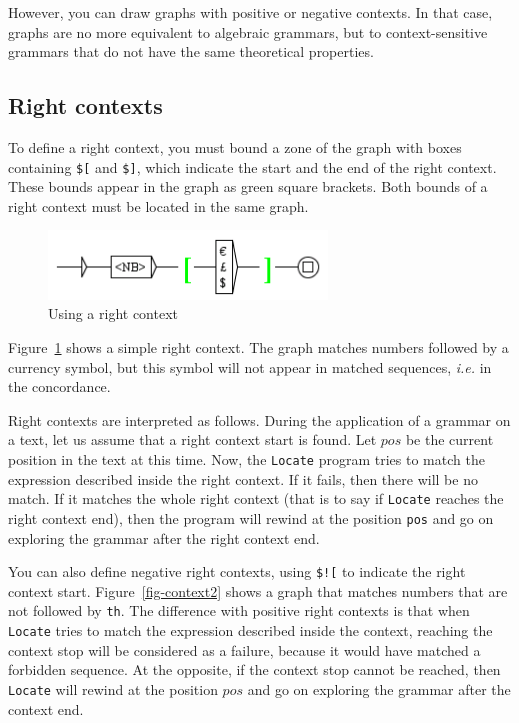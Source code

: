 \bigskip
\noindent However, you can draw graphs with positive or negative contexts. In
that case, graphs are no more equivalent to algebraic grammars, but to context-sensitive
grammars that do not have the same theoretical properties.

\subsection{Right contexts}
\index{\verb+$[+}
\index{\verb+$]+}
To define a right context, you must bound a zone of the graph with boxes
containing \verb+$[+ and \verb+$]+, which indicate the start and the end of the
right context. These bounds appear in the graph as green square brackets. Both
bounds of a right context must be located in the same graph.

\bigskip
\begin{figure}[!h]
\begin{center}
\includegraphics[width=7.4cm]{resources/img/fig6-12.png}
\caption{Using a right context\label{fig-context1}}
\end{center}
\end{figure}

\bigskip
\noindent Figure~\ref{fig-context1} shows a simple right context. The graph
matches numbers followed by a currency symbol, but this symbol will not appear in
matched sequences, \textit{i.e.} in the concordance.

\bigskip
\noindent Right contexts are interpreted as follows. During the application of a
grammar on a text, let us assume that a right context start is found. Let $pos$ be the
current position in the text at this time. Now, the \verb$Locate$ program tries to match
the expression described inside the right context. If it fails, then there will
be no match. If it matches the whole right context (that is to say if
\verb$Locate$ reaches the right context end), then the program will rewind at
the position \verb$pos$ and go on exploring the grammar after the right context
end.

\bigskip
\noindent You can also define negative right contexts,
using \verb+$![+ to indicate the right context start. Figure~\ref{fig-context2}
shows a graph that matches numbers that are not followed by \verb+th+. The difference
with positive right contexts is that when \verb$Locate$ tries to match the
expression described inside the context, reaching the context stop will be
considered as a failure, because it would have matched a forbidden sequence. At the opposite, if
the context stop cannot be reached, then \verb$Locate$ will rewind at the
position $pos$ and go on exploring the grammar after the context end.

